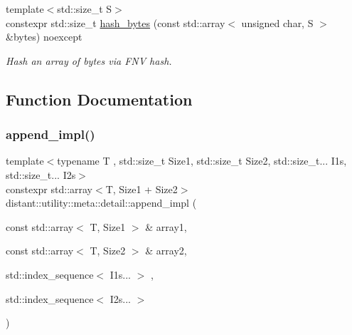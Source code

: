 \begin{DoxyCompactItemize}
\item 
{\footnotesize template$<$std\+::size\+\_\+t S$>$ }\\constexpr std\+::size\+\_\+t \mbox{\hyperlink{namespacedistant_1_1utility_1_1meta_1_1detail_a0824a52171ef3f8f87f4da725fa31882}{hash\+\_\+bytes}} (const std\+::array$<$ unsigned char, S $>$ \&bytes) noexcept
\begin{DoxyCompactList}\small\item\em Hash an array of bytes via F\+NV hash. \end{DoxyCompactList}\end{DoxyCompactItemize}


\subsection{Function Documentation}
\mbox{\label{namespacedistant_1_1utility_1_1meta_1_1detail_a82eef55cdc38f07164682ad05619ffe2}} 
\subsubsection{\texorpdfstring{append\+\_\+impl()}{append\_impl()}}
{\footnotesize\ttfamily template$<$typename T , std\+::size\+\_\+t Size1, std\+::size\+\_\+t Size2, std\+::size\+\_\+t... I1s, std\+::size\+\_\+t... I2s$>$ \\
constexpr std\+::array$<$T, Size1 + Size2$>$ distant\+::utility\+::meta\+::detail\+::append\+\_\+impl (\begin{DoxyParamCaption}\item[{const std\+::array$<$ T, Size1 $>$ \&}]{array1,  }\item[{const std\+::array$<$ T, Size2 $>$ \&}]{array2,  }\item[{std\+::index\+\_\+sequence$<$ I1s... $>$}]{,  }\item[{std\+::index\+\_\+sequence$<$ I2s... $>$}]{ }\end{DoxyParamCaption})\hspace{0.3cm}{\ttfamily [noexcept]}}

\mbox{\label{namespacedistant_1_1utility_1_1meta_1_1detail_a4382d186581307ddda4aaa043514844b}} 
